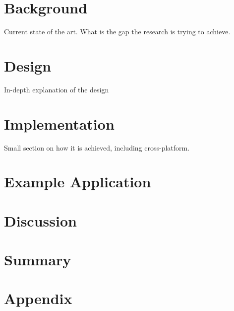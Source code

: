 \documentclass{article}
\begin{document}
\section{Background}
Current state of the art. What is the gap the research is trying to achieve.

\section{Design}
In-depth explanation of the design 

\section{Implementation}
Small section on how it is achieved, including cross-platform.

\section{Example Application}


\section{Discussion}


\section{Summary}


\section{Appendix}





\end{document}
